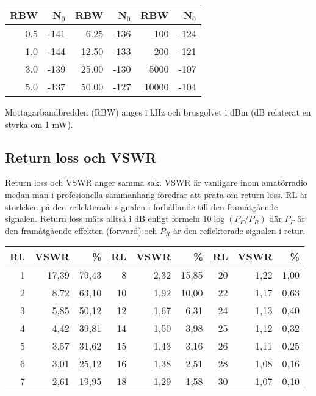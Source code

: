 \begin{center}
\begin{tabular}{rr|rr|rr}
	\textbf{RBW} & \textbf{N$_0$} & \textbf{RBW} & \textbf{N$_0$} & \textbf{RBW} & \textbf{N$_0$} \\ \hline
	         0.5 &           -141 &         6.25 &           -136 &          100 &           -124 \\
	         1.0 &           -144 &        12.50 &           -133 &          200 &           -121 \\
	         3.0 &           -139 &        25.00 &           -130 &         5000 &           -107 \\
	         5.0 &           -137 &        50.00 &           -127 &        10000 &           -104
\end{tabular}
\end{center}

Mottagarbandbredden (RBW) anges i kHz och brusgolvet i dBm (dB relaterat en styrka om 1 mW).

\subsection{Return loss och VSWR}

Return loss och VSWR anger samma sak. VSWR är vanligare inom amatörradio medan man i profesionella sammanhang föredrar att prata om return loss. RL är storleken på den reflekterade signalen i förhållande till den framåtgående signalen. Return loss mäts alltså i dB enligt formeln $10\log(P_F/P_R)$ där $P_F$ är den framåtgående effekten (forward) och  $P_R$ är den reflekterade signalen i retur.

\begin{longtable}{rrr|rrr|rrr}
	\textbf{RL} & \textbf{VSWR} & \textbf{\%} & \textbf{RL} & \textbf{VSWR} & \textbf{\%} & \textbf{RL} & \textbf{VSWR} & \textbf{\%} \\ \hline 	\endhead
	          1 &         17,39 &       79,43 &           8 &          2,32 &       15,85 &          20 &          1,22 &        1,00 \\
	          2 &          8,72 &       63,10 &          10 &          1,92 &       10,00 &          22 &          1,17 &        0,63 \\
	          3 &          5,85 &       50,12 &          12 &          1,67 &        6,31 &          24 &          1,13 &        0,40 \\
	          4 &          4,42 &       39,81 &          14 &          1,50 &        3,98 &          25 &          1,12 &        0,32 \\
	          5 &          3,57 &       31,62 &          15 &          1,43 &        3,16 &          26 &          1,11 &        0,25 \\
	          6 &          3,01 &       25,12 &          16 &          1,38 &        2,51 &          28 &          1,08 &        0,16 \\
	          7 &          2,61 &       19,95 &          18 &          1,29 &        1,58 &          30 &          1,07 &        0,10
\end{longtable}

